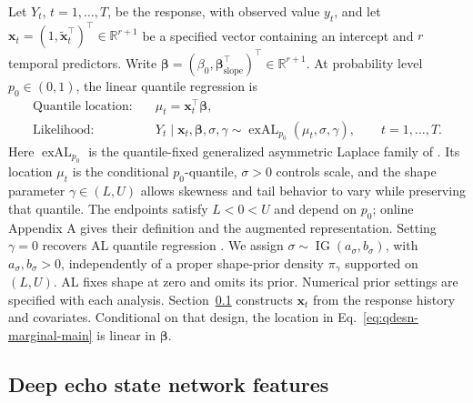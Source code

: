 \documentclass[12pt,letterpaper]{article}
\numberwithin{equation}{section}
\newcommand{\R}{\mathbb{R}}
\newcommand{\vect}[1]{\bm{#1}}
\DeclareMathOperator{\IG}{IG}
\newcommand{\exAL}{\operatorname{exAL}}
\begin{document}
Let \(Y_t\), \(t=1,\ldots,T\), be the response, with observed value
\(y_t\), and let
\(\vect x_t=(1,\tilde{\vect x}_t^\top)^\top\in\R^{r+1}\) be a specified
vector containing an intercept and \(r\) temporal predictors. Write
\(\vect\beta=(\beta_0,\vect\beta_{\mathrm{slope}}^\top)^\top\in\R^{r+1}\).
At probability level \(p_0\in(0,1)\), the linear quantile regression is
\begin{equation}
\begin{aligned}
\text{Quantile location:}\quad &\mu_t=\vect x_t^\top\vect\beta,\\
\text{Likelihood:}\quad
&Y_t\mid\vect x_t,\vect\beta,\sigma,\gamma
  \sim\exAL_{p_0}(\mu_t,\sigma,\gamma),\qquad t=1,\ldots,T.
\end{aligned}
\label{eq:qdesn-marginal-main}
\end{equation}
Here \(\exAL_{p_0}\) is the quantile-fixed generalized asymmetric Laplace
family of \citet{yan2025new}. Its location \(\mu_t\) is the conditional
\(p_0\)-quantile, \(\sigma>0\) controls scale, and the shape parameter
\(\gamma\in(L,U)\) allows skewness and tail behavior to vary while preserving
that quantile. The endpoints satisfy \(L<0<U\) and depend on \(p_0\);
online Appendix A gives their definition and the augmented representation.
Setting \(\gamma=0\)
recovers AL quantile regression
\citep{yu2001bayesian,KozumiKobayashi2011Gibbs}. We assign
\(\sigma\sim\IG(a_\sigma,b_\sigma)\), with
\(a_\sigma,b_\sigma>0\), independently of a proper shape-prior density
\(\pi_\gamma\) supported on \((L,U)\). AL fixes shape at zero and omits
its prior. Numerical prior settings are specified with each analysis.
Section~\ref{subsec:desn-features} constructs
\(\vect x_t\) from the response
history and covariates. Conditional on that design, the location in
Eq.~\eqref{eq:qdesn-marginal-main} is linear in \(\vect\beta\).

\subsection{Deep echo state network features}
\label{subsec:desn-features}
\end{document}
